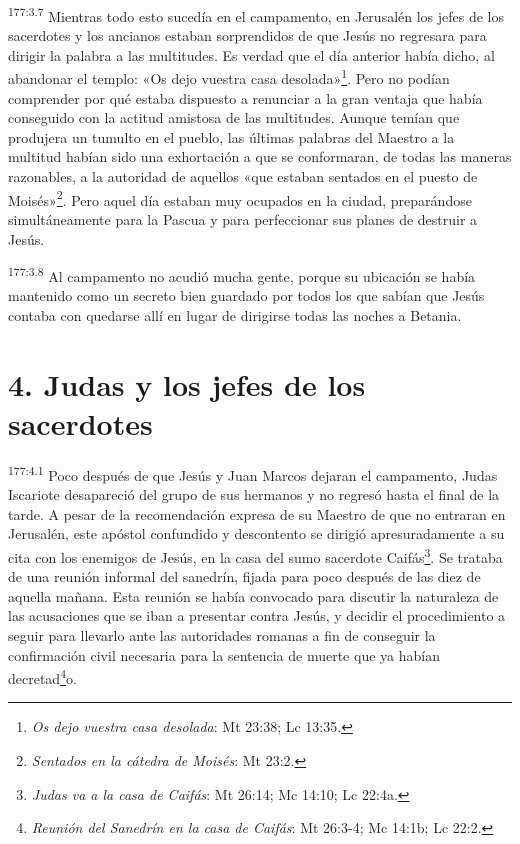 \par
\textsuperscript{177:3.7} Mientras todo esto sucedía en el campamento, en Jerusalén los jefes de los sacerdotes y los ancianos estaban sorprendidos de que Jesús no regresara para dirigir la palabra a las multitudes. Es verdad que el día anterior había dicho, al abandonar el templo: «Os dejo vuestra casa desolada»\footnote{\textit{Os dejo vuestra casa desolada}: Mt 23:38; Lc 13:35.}. Pero no podían comprender por qué estaba dispuesto a renunciar a la gran ventaja que había conseguido con la actitud amistosa de las multitudes. Aunque temían que produjera un tumulto en el pueblo, las últimas palabras del Maestro a la multitud habían sido una exhortación a que se conformaran, de todas las maneras razonables, a la autoridad de aquellos «que estaban sentados en el puesto de Moisés»\footnote{\textit{Sentados en la cátedra de Moisés}: Mt 23:2.}. Pero aquel día estaban muy ocupados en la ciudad, preparándose simultáneamente para la Pascua y para perfeccionar sus planes de destruir a Jesús.

\par
\textsuperscript{177:3.8} Al campamento no acudió mucha gente, porque su ubicación se había mantenido como un secreto bien guardado por todos los que sabían que Jesús contaba con quedarse allí en lugar de dirigirse todas las noches a Betania.

\section*{4. Judas y los jefes de los sacerdotes}
\par
\textsuperscript{177:4.1} Poco después de que Jesús y Juan Marcos dejaran el campamento, Judas Iscariote desapareció del grupo de sus hermanos y no regresó hasta el final de la tarde. A pesar de la recomendación expresa de su Maestro de que no entraran en Jerusalén, este apóstol confundido y descontento se dirigió apresuradamente a su cita con los enemigos de Jesús, en la casa del sumo sacerdote Caifás\footnote{\textit{Judas va a la casa de Caifás}: Mt 26:14; Mc 14:10; Lc 22:4a.}. Se trataba de una reunión informal del sanedrín, fijada para poco después de las diez de aquella mañana. Esta reunión se había convocado para discutir la naturaleza de las acusaciones que se iban a presentar contra Jesús, y decidir el procedimiento a seguir para llevarlo ante las autoridades romanas a fin de conseguir la confirmación civil necesaria para la sentencia de muerte que ya habían decretad\footnote{\textit{Reunión del Sanedrín en la casa de Caifás}: Mt 26:3-4; Mc 14:1b; Lc 22:2.}o.

